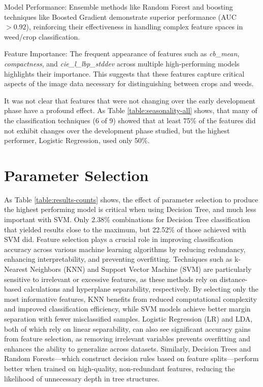 \documentclass[letterpaper, notitlepage]{report}
\begin{document}
{

}

Model Performance:
Ensemble methods like Random Forest  and boosting techniques like Boosted Gradient demonstrate superior performance (AUC $> 0.92$), reinforcing their effectiveness in handling complex feature spaces in weed/crop classification.

Feature Importance:
The frequent appearance of features such as \textit{cb\_mean}, \textit{compactness}, and \textit{cie\_l\_lbp\_stddev} across multiple high-performing models highlights their importance. This suggests that these features capture critical aspects of the image data necessary for distinguishing between crops and weeds.

It was not clear that features that were not changing over the early development phase have a profound effect. As Table \ref{table:seasonality-all} shows, that many of the classification techniques (6 of 9) showed that at least 75\% of the features did not exhibit changes over the development phase studied, but the highest performer, Logistic Regression, used only 50\%.


\section{Parameter Selection}
As Table \ref{table:results-counts} shows, the effect of parameter selection to produce the highest performing model is critical when using Decision Tree, and much less important with SVM. 
Only 2.38\% combinations for Decision Tree classification that yielded results close to the maximum, but 22.52\% of those achieved with SVM did. 
Feature selection plays a crucial role in improving classification accuracy across various machine learning algorithms by reducing redundancy, enhancing interpretability, and preventing overfitting. Techniques such as k-Nearest Neighbors (KNN) and Support Vector Machine (SVM) are particularly sensitive to irrelevant or excessive features, as these methods rely on distance-based calculations and hyperplane separability, respectively. By selecting only the most informative features, KNN benefits from reduced computational complexity and improved classification efficiency, while SVM models achieve better margin separation with fewer misclassified samples. Logistic Regression (LR) and \gls{LDA}, both of which rely on linear separability, can also see significant accuracy gains from feature selection, as removing irrelevant variables prevents overfitting and enhances the ability to generalize across datasets. Similarly, Decision Trees and Random Forests—which construct decision rules based on feature splits—perform better when trained on high-quality, non-redundant features, reducing the likelihood of unnecessary depth in tree structures.
\end{document}
